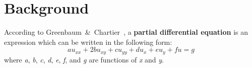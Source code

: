 \documentclass[12pt, titlepage]{article}
\title{\mytitle}
\author{Jaden Nola}
\begin{document}
    \maketitle
    \section*{Background} 
    According to Greenbaum~\&~Chartier~\cite{greenbaum}, a \textbf{partial differential equation} is an expression which can be written
    in the following form:
    \begin{equation}
        au_{xx} + 2bu_{xy} + cu_{yy} + du_{x} + eu_{y} + fu = g
    \end{equation}
    where \textit{a}, \textit{b}, \textit{c}, \textit{d}, \textit{e}, \textit{f}, and \textit{g} are functions of \textit{x} and \textit{y}.
    \newpage 
    
    {}
\end{document}
